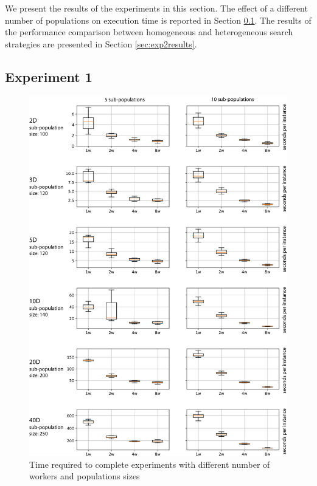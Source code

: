 \documentclass[review]{elsarticle}
\begin{document}
We present the results of the experiments in this section. The effect of a
different number of populations on execution time is reported in  Section
\ref{sec:exp1results}. The results of the performance comparison between homogeneous and
heterogeneous search strategies are presented in Section \ref{sec:exp2results}.     

\subsection{Experiment 1}
\label{sec:exp1results}

\begin{figure}[h!tb]
    \centering
    \includegraphics[width=\textwidth]{sp_size_worker}
    \caption{Time required to complete experiments with different number of workers and populations sizes }
    \label{fig:spworker}
\end{figure}
\end{document}
